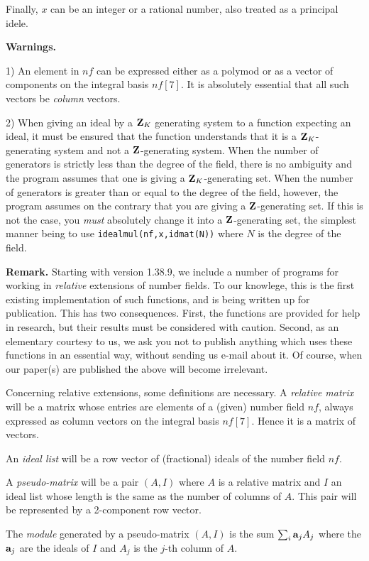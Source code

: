 Finally, $x$ can be an integer or a rational number, also treated as a
principal idele.

{\bf Warnings.}

1) An element in $nf$ can be expressed either as a
polymod or as a vector of components on the integral basis $nf[7]$. It
is absolutely essential that all such vectors be {\it column\/} vectors.

2) When giving an ideal by a ${\bf Z}_K$ generating system to a function 
expecting an ideal, it must be ensured that the function understands 
that it is a ${\bf Z}_K$-generating system and not a ${\bf Z}$-generating system.
When the number of generators is strictly less than the degree of the
field, there is no ambiguity and the program assumes that one is
giving a ${\bf Z}_K$-generating set. When the number of generators is greater
than or equal to the degree of the field, however, the program assumes
on the contrary that you are giving a ${\bf Z}$-generating set. If this is
not the case, you {\it must\/} absolutely change it into a ${\bf Z}$-generating
set, the simplest manner being to use {\tt idealmul(nf,x,idmat(N))}
where $N$ is the degree of the field.

{\bf Remark.} Starting with version 1.38.9, we include a number of 
programs for working in {\it relative\/} extensions of number fields. To
our knowlege, this is the first existing implementation of such 
functions, and is being written up for publication. This has two 
consequences. First, the functions are provided for help in research,
but their results must be considered with caution. Second, as an
elementary courtesy to us, we ask you not to publish anything which
uses these functions in an essential way, without sending us e-mail
about it. Of course, when our paper(s) are published the above will
become irrelevant.

Concerning relative extensions, some definitions are necessary. 
A {\it relative matrix\/} will be a matrix whose entries are elements
of a (given) number field $nf$, always expressed as column vectors on
the integral basis $nf[7]$. Hence it is a matrix of vectors.

An {\it ideal list\/} will be a row vector of (fractional) ideals of the
number field $nf$.

A {\it pseudo-matrix\/} will be a pair $(A,I)$ where $A$ is a relative
matrix and $I$ an ideal list whose length is the same as the number of
columns of $A$. This pair will be represented by a 2-component row vector.

The {\it module\/} generated by a pseudo-matrix $(A,I)$ is the sum
$\sum_i{\bf a}_jA_j$ where the ${\bf a}_j$ are the ideals of $I$ and $A_j$ is the
$j$-th column of $A$.

